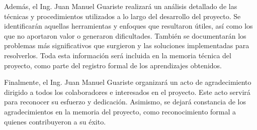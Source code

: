 \documentclass[
11pt, %
]{charter}
\begin{document}
Además, el Ing. Juan Manuel Guariste realizará un análisis detallado de las técnicas y procedimientos utilizados a lo largo del desarrollo del proyecto. Se identificarán aquellas herramientas y enfoques que resultaron útiles, así como los que no aportaron valor o generaron dificultades. También se documentarán los problemas más significativos que surgieron y las soluciones implementadas para resolverlos. Toda esta información será incluida en la memoria técnica del proyecto, como parte del registro formal de los aprendizajes obtenidos.

Finalmente, el Ing. Juan Manuel Guariste organizará un acto de agradecimiento dirigido a todos los colaboradores e interesados en el proyecto. Este acto servirá para reconocer su esfuerzo y dedicación. Asimismo, se dejará constancia de los agradecimientos en la memoria del proyecto, como reconocimiento formal a quienes contribuyeron a su éxito.
\end{document}
